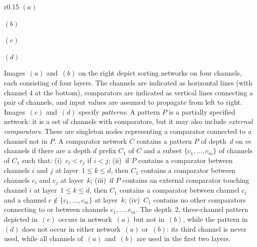\documentclass[10pt]{IEEEtran}
\begin{document}
\begin{wrapfigure}[11]{r}{0.15\textwidth}
  \vspace*{-2ex}
  $(a)$~

  \vspace{1em}

  $(b)$~

  \vspace{1em}

  $(c)$~

  \vspace{1em}

  $(d)$~
  \label{ex:sn}
\end{wrapfigure}

Images~$(a)$ and~$(b)$ on the right depict sorting networks on four
channels, each consisting of four layers. The channels are indicated
as horizontal lines (with channel $4$ at the bottom), comparators are
indicated as vertical lines connecting a pair of channels, and input
values are assumed to propagate from left to right. Images~$(c)$ and~$(d)$
specify \emph{patterns}.
A pattern $P$ is a partially specified network: it is a set of
channels with comparators, but it may also include \emph{external comparators}.
These are singleton nodes representing a comparator connected to a channel not in $P$.  
A comparator network $C$ contains a pattern $P$ of depth~$d$ on $m$
channels if there are a depth $d$ prefix $C_1$ of $C$ and a subset
$\{c_1,\ldots,c_m\}$ of channels of $C_1$ such that: (i)~$c_i<c_j$ if
$i<j$; (ii)~if $P$ contains a comparator between channels $i$ and $j$
at layer~$1\leq k\leq d$, then $C_1$ contains a comparator between
channels $c_i$ and $c_j$ at layer~$k$; (iii)~if $P$ contains an
external comparator touching channel $i$ at layer~$1\leq k\leq d$,
then $C_1$ contains a comparator between channel $c_i$ and a channel
$c\not\in\{c_1,\ldots,c_m\}$ at layer~$k$; (iv)~$C_1$ 
contains no other comparators connecting to or between channels
$c_1,\ldots,c_m$.
The depth~$2$, three-channel pattern depicted in~$(c)$ occurs in network~$(a)$
but not in~$(b)$, while the pattern in~$(d)$ does not occur in
either network~$(a)$ or~$(b)$: its third channel is never used, while
all channels of~$(a)$ and~$(b)$ are used in the
first two layers.
\end{document}
